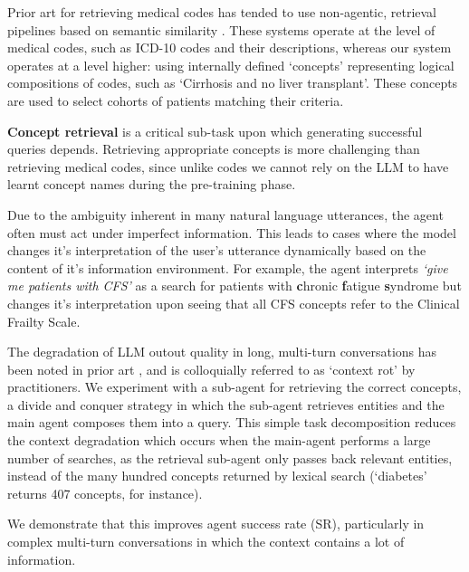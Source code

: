\documentclass[11pt]{article}
\begin{document}
Prior art for retrieving medical codes has tended to use non-agentic, retrieval pipelines based on semantic similarity \citet{baksi_medcoder_2024, ziletti_retrieval_2024}.
These systems operate at the level of medical codes, such as ICD-10 codes and their descriptions, whereas our system operates at a level higher: using internally defined `concepts' representing logical compositions of codes, such as `Cirrhosis and no liver transplant'.
These concepts are used to select cohorts of patients matching their criteria.

\textbf{Concept retrieval} is a critical sub-task upon which generating successful queries depends.
Retrieving appropriate concepts is more challenging than retrieving medical codes, since unlike codes we cannot rely on the LLM to have learnt concept names during the pre-training phase.

Due to the ambiguity inherent in many natural language utterances, the agent often must act under imperfect information.
This leads to cases where the model changes it's interpretation of the user's utterance dynamically based on the content of it's information environment.
For example, the agent interprets \textit{`give me patients with CFS'} as a search for patients with \textbf{c}hronic \textbf{f}atigue \textbf{s}yndrome but changes it's interpretation upon seeing that all CFS concepts refer to the Clinical Frailty Scale. 


The degradation of LLM outout quality in long, multi-turn conversations has been noted in prior art \cite{laban_llms_2025}, and is colloquially referred to as `context rot' by practitioners.
We experiment with a sub-agent for retrieving the correct concepts, a divide and conquer strategy in which the sub-agent retrieves entities and the main agent composes them into a query.
This simple task decomposition reduces the context degradation which occurs when the main-agent performs a large number of searches, as the retrieval sub-agent only passes back relevant entities, instead of the many hundred concepts returned by lexical search (`diabetes' returns 407 concepts, for instance).

We demonstrate that this improves agent success rate (SR), particularly in complex multi-turn conversations in which the context contains a lot of information.
\end{document}
